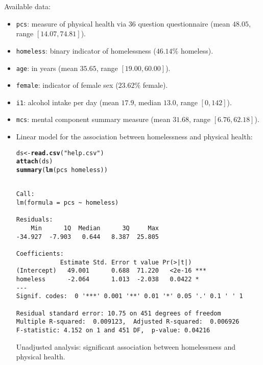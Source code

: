 \documentclass[oneside]{book}\usepackage[]{graphicx}\usepackage[svgnames]{xcolor}
\makeatletter
\newcommand{\hlstr}[1]{\textcolor[rgb]{0.192,0.494,0.8}{#1}}%
\newcommand{\hlopt}[1]{\textcolor[rgb]{0,0,0}{#1}}%
\newcommand{\hlstd}[1]{\textcolor[rgb]{0.345,0.345,0.345}{#1}}%
\newcommand{\hlkwb}[1]{\textcolor[rgb]{0.69,0.353,0.396}{#1}}%
\newcommand{\hlkwd}[1]{\textcolor[rgb]{0.737,0.353,0.396}{\textbf{#1}}}%
\newenvironment{kframe}{%
 \def\at@end@of@kframe{}%
 \ifinner\ifhmode%
  \def\at@end@of@kframe{\end{minipage}}%
  \begin{minipage}{\columnwidth}%
 \fi\fi%
 \def\FrameCommand##1{\hskip\@totalleftmargin \hskip-\fboxsep
 \colorbox{shadecolor}{##1}\hskip-\fboxsep
     \hskip-\linewidth \hskip-\@totalleftmargin \hskip\columnwidth}%
 \MakeFramed {\advance\hsize-\width
   \@totalleftmargin\z@ \linewidth\hsize
   \@setminipage}}%
 {\par\unskip\endMakeFramed%
 \at@end@of@kframe}
\newenvironment{knitrout}{}{} %
\makeatother
\begin{document}
Available data:
\begin{itemize}
      \item \texttt{pcs}: measure of physical health via 36 question questionnaire
            (mean $48.05$, range $[14.07, 74.81]$).
      \item \texttt{homeless}: binary indicator of homelessness ($46.14\%$ homeless).
      \item \texttt{age}: in years (mean $35.65$, range $[19.00, 60.00]$).
      \item \texttt{female}: indicator of female sex ($23.62\%$ female).
      \item \texttt{i1}: alcohol intake per day (mean $17.9$, median $13.0$, range $[0,142]$).
      \item \texttt{mcs}: mental component summary measure
            (mean $31.68$, range $[6.76, 62.18]$).
\end{itemize}
\begin{itemize}
      \item Linear model for the association between homelessness and
            physical health:
\begin{knitrout}
\color{fgcolor}\begin{kframe}
\begin{alltt}
\hlstd{ds} \hlkwb{<-} \hlkwd{read.csv}\hlstd{(}\hlstr{"help.csv"}\hlstd{)}
\hlkwd{attach}\hlstd{(ds)}
\hlkwd{summary}\hlstd{(}\hlkwd{lm}\hlstd{(pcs} \hlopt{~} \hlstd{homeless))}
\end{alltt}
\begin{verbatim}

Call:
lm(formula = pcs ~ homeless)

Residuals:
    Min      1Q  Median      3Q     Max 
-34.927  -7.903   0.644   8.387  25.805 

Coefficients:
            Estimate Std. Error t value Pr(>|t|)    
(Intercept)   49.001      0.688  71.220   <2e-16 ***
homeless      -2.064      1.013  -2.038   0.0422 *  
---
Signif. codes:  0 '***' 0.001 '**' 0.01 '*' 0.05 '.' 0.1 ' ' 1

Residual standard error: 10.75 on 451 degrees of freedom
Multiple R-squared:  0.009123,	Adjusted R-squared:  0.006926 
F-statistic: 4.152 on 1 and 451 DF,  p-value: 0.04216
\end{verbatim}
\end{kframe}
\end{knitrout}
            Unadjusted analysis: significant association between homelessness
            and physical health.
\end{itemize}
\end{document}
